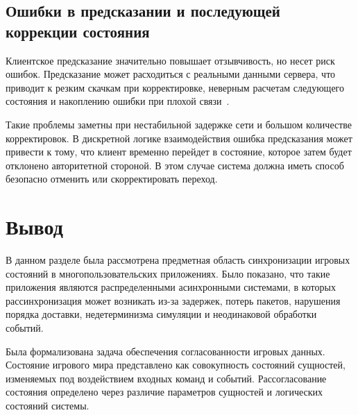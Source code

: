 \subsection{Ошибки в предсказании и последующей коррекции состояния}

Клиентское предсказание значительно повышает отзывчивость, но несет риск ошибок. Предсказание может расходиться с реальными данными сервера, что приводит к резким скачкам при корректировке, неверным расчетам следующего состояния и накоплению ошибки при плохой связи~\cite{gamenetpatterns}.

Такие проблемы заметны при нестабильной задержке сети и большом количестве корректировок. В дискретной логике взаимодействия ошибка предсказания может привести к тому, что клиент временно перейдет в состояние, которое затем будет отклонено авторитетной стороной. В этом случае система должна иметь способ безопасно отменить или скорректировать переход.

\section*{Вывод}

В данном разделе была рассмотрена предметная область синхронизации игровых состояний в многопользовательских приложениях. 
Было показано, что такие приложения являются распределенными асинхронными системами, в которых рассинхронизация может возникать из-за задержек, потерь пакетов, нарушения порядка доставки, 
недетерминизма симуляции и неодинаковой обработки событий.

Была формализована задача обеспечения согласованности игровых данных. Состояние игрового мира представлено как совокупность состояний сущностей, изменяемых под воздействием входных команд и событий. 
Рассогласование состояния определено через различие параметров сущностей и логических состояний системы.
